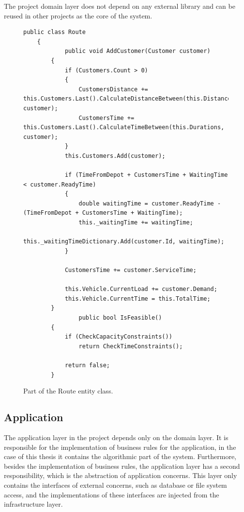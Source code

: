 \documentclass[a4paper,twoside,12pt]{book}
\begin{document}
The project domain layer does not depend on any external library and can be reused in other projects as the core of the system.

\begin{figure}
\centering
\begin{lstlisting}
public class Route
    {
            public void AddCustomer(Customer customer)
        {
            if (Customers.Count > 0)
            {
                CustomersDistance += this.Customers.Last().CalculateDistanceBetween(this.Distances, customer);
                CustomersTime += this.Customers.Last().CalculateTimeBetween(this.Durations, customer);
            }
            this.Customers.Add(customer);

            if (TimeFromDepot + CustomersTime + WaitingTime < customer.ReadyTime)
            {
                double waitingTime = customer.ReadyTime - (TimeFromDepot + CustomersTime + WaitingTime);
                this._waitingTime += waitingTime;
                this._waitingTimeDictionary.Add(customer.Id, waitingTime);
            }

            CustomersTime += customer.ServiceTime;

            this.Vehicle.CurrentLoad += customer.Demand;
            this.Vehicle.CurrentTime = this.TotalTime;
        }
                public bool IsFeasible()
        {
            if (CheckCapacityConstraints())
                return CheckTimeConstraints();

            return false;
        }
\end{lstlisting}
\caption{Part of the Route entity class.}
\label{fig:routeMethod}
\end{figure}




\subsection{Application}

The application layer in the project depends only on the domain layer. It is responsible for the implementation of business rules for the application, in the case of this thesis it contains the algorithmic part of the system. Furthermore, besides the implementation of business rules, the application layer has a second responsibility, which is the abstraction of application concerns. This layer only contains the interfaces of external concerns, such as database or file system access, and the implementations of these interfaces are injected from the infrastructure layer. 
\end{document}
